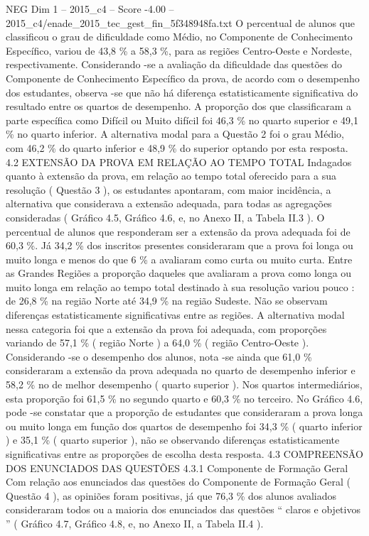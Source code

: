 \begin{textsample}{NEG Dim 1 – 2015\_c4 – Score -4.00 – 2015\_c4/enade\_2015\_tec\_gest\_fin\_5f348948fa.txt}
O percentual de alunos que classificou o grau de dificuldade como Médio, no Componente de Conhecimento Específico, variou de 43,8 \% a 58,3 \%, para as regiões Centro-Oeste e Nordeste, respectivamente.
Considerando -se a avaliação da dificuldade das questões do Componente de Conhecimento Específico da prova, de acordo com o desempenho dos estudantes, observa -se que não há diferença estatisticamente significativa do resultado entre os quartos de desempenho.
A proporção dos que classificaram a parte específica como Difícil ou Muito difícil foi 46,3 \% no quarto superior e 49,1 \% no quarto inferior.
A alternativa modal para a Questão 2 foi o grau Médio, com 46,2 \% do quarto inferior e 48,9 \% do superior optando por esta resposta. 4.2 EXTENSÃO DA PROVA EM RELAÇÃO AO TEMPO TOTAL Indagados quanto à extensão da prova, em relação ao tempo total oferecido para a sua resolução ( Questão 3 ), os estudantes apontaram, com maior incidência, a alternativa que considerava a extensão adequada, para todas as agregações consideradas ( Gráfico 4.5, Gráfico 4.6, e, no Anexo II, a Tabela II.3 ).
O percentual de alunos que responderam ser a extensão da prova adequada foi de 60,3 \%.
Já 34,2 \% dos inscritos presentes consideraram que a prova foi longa ou muito longa e menos do que 6 \% a avaliaram como curta ou muito curta.
Entre as Grandes Regiões a proporção daqueles que avaliaram a prova como longa ou muito longa em relação ao tempo total destinado à sua resolução variou pouco : de 26,8 \% na região Norte até 34,9 \% na região Sudeste.
Não se observam diferenças estatisticamente significativas entre as regiões.
A alternativa modal nessa categoria foi que a extensão da prova foi adequada, com proporções variando de 57,1 \% ( região Norte ) a 64,0 \% ( região Centro-Oeste ).
Considerando -se o desempenho dos alunos, nota -se ainda que 61,0 \% consideraram a extensão da prova adequada no quarto de desempenho inferior e 58,2 \% no de melhor desempenho ( quarto superior ).
Nos quartos intermediários, esta proporção foi 61,5 \% no segundo quarto e 60,3 \% no terceiro.
No Gráfico 4.6, pode -se constatar que a proporção de estudantes que consideraram a prova longa ou muito longa em função dos quartos de desempenho foi 34,3 \% ( quarto inferior ) e 35,1 \% ( quarto superior ), não se observando diferenças estatisticamente significativas entre as proporções de escolha desta resposta. 4.3 COMPREENSÃO DOS ENUNCIADOS DAS QUESTÕES 4.3.1 Componente de Formação Geral Com relação aos enunciados das questões do Componente de Formação Geral ( Questão 4 ), as opiniões foram positivas, já que 76,3 \% dos alunos avaliados consideraram todos ou a maioria dos enunciados das questões “ claros e objetivos ” ( Gráfico 4.7, Gráfico 4.8, e, no Anexo II, a Tabela II.4 ).

\end{textsample}
